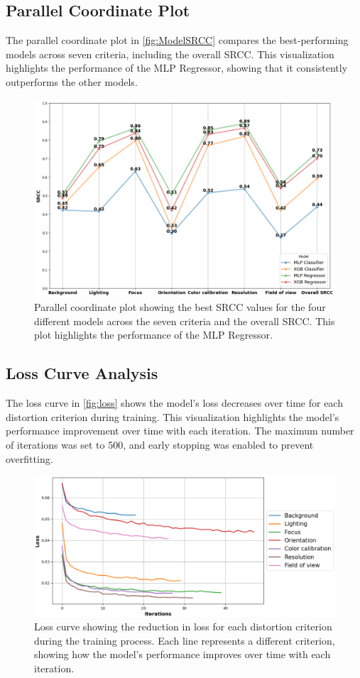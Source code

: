 \subsection{Parallel Coordinate Plot}
\label{subsec:ParallelCoordinatePlot}
The parallel coordinate plot in \autoref{fig:ModelSRCC} compares the best-performing models across seven criteria, including the overall SRCC. This visualization highlights the performance of the MLP Regressor, showing that it consistently outperforms the other models.\par
\begin{figure}[ht]
    \centering
    \includegraphics[keepaspectratio,width=12.5cm]{img/Model_SRCC.png}
    \caption{Parallel coordinate plot showing the best SRCC values for the four different models across the seven criteria and the overall SRCC. This plot highlights the performance of the MLP Regressor.}
    \label{fig:ModelSRCC}
\end{figure}
\clearpage
\subsection{Loss Curve Analysis}
\label{subsec:LossCurveAnalysis}
The loss curve in \autoref{fig:loss} shows the model's loss decreases over time for each distortion criterion during training. This visualization highlights the model’s performance improvement over time with each iteration. The maximum number of iterations was set to 500, and early stopping was enabled to prevent overfitting.
\begin{figure}[ht]
    \centering
    \includegraphics[keepaspectratio,width=15cm]{img/loss.png}
    \caption{Loss curve showing the reduction in loss for each distortion criterion during the training process. Each line represents a different criterion, showing how the model’s performance improves over time with each iteration.}
    \label{fig:loss}
\end{figure}

